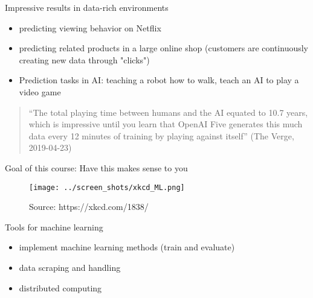 \documentclass[xcolor=dvipsnames, handout]{beamer}
\begin{document}
\begin{frame}{Impressive results in data-rich environments}
\begin{itemize}
  \item 
  predicting viewing behavior on Netflix
  \item 
  predicting related products in a large online shop (customers are continuously creating new data through "clicks")
  \item 
  \pause
  Prediction tasks in AI: teaching a robot how to walk, teach an AI to play a video game 
\end{itemize}
\begin{quote}
``The total playing time between humans and the AI equated to 10.7 years, which is impressive until you learn that OpenAI Five generates this much data every 12 minutes of training by playing against itself'' (The Verge, 2019-04-23)
\end{quote}
\end{frame}


\begin{frame}{Goal of this course: Have this makes sense to you}
\begin{figure}
  \texttt{[image: ../screen\_shots/xkcd\_ML.png]}
   \caption{Source: https://xkcd.com/1838/}
\end{figure}
\end{frame}


\begin{frame}{Tools for machine learning}
\begin{itemize}
  \item implement machine learning methods (train and evaluate)
  \item data scraping and handling 
  \item distributed computing 
\end{itemize}
\end{frame}
\end{document}
